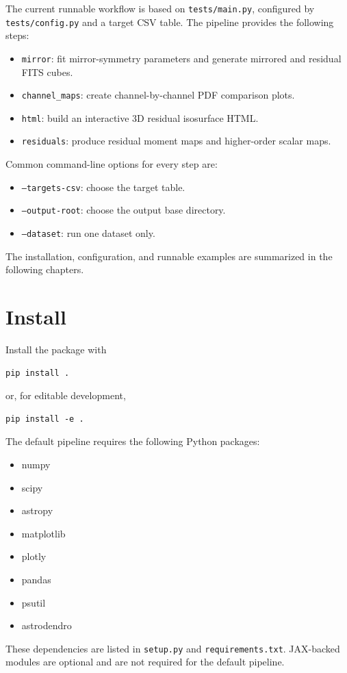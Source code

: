 \documentclass{report}
\begin{document}
The current runnable workflow is based on \texttt{tests/main.py}, configured by \texttt{tests/config.py} and a target CSV table. The pipeline provides the following steps:
\begin{itemize}
\item \texttt{mirror}: fit mirror-symmetry parameters and generate mirrored and residual FITS cubes.
\item \texttt{channel\_maps}: create channel-by-channel PDF comparison plots.
\item \texttt{html}: build an interactive 3D residual isosurface HTML.
\item \texttt{residuals}: produce residual moment maps and higher-order scalar maps.
\end{itemize}

Common command-line options for every step are:
\begin{itemize}
\item \texttt{--targets-csv}: choose the target table.
\item \texttt{--output-root}: choose the output base directory.
\item \texttt{--dataset}: run one dataset only.
\end{itemize}

The installation, configuration, and runnable examples are summarized in the following chapters.


\chapter{Install \label{sec:reuired}}
Install the package with
\begin{verbatim}
pip install .
\end{verbatim}
or, for editable development,
\begin{verbatim}
pip install -e .
\end{verbatim}

The default pipeline requires the following Python packages:
\begin{itemize}
    \item numpy
    \item scipy
    \item astropy
    \item matplotlib
    \item plotly
    \item pandas
    \item psutil
    \item astrodendro
\end{itemize}
These dependencies are listed in \texttt{setup.py} and \texttt{requirements.txt}. JAX-backed modules are optional and are not required for the default pipeline.
\end{document}
